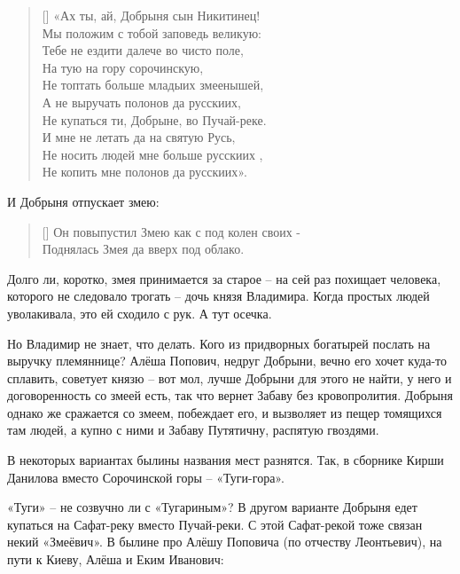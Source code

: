 \settowidth{\versewidth}{Не купаться ти, Добрыне, во Пучай-реке.} 
\begin{verse}[\versewidth]
«Ах ты, ай, Добрыня сын Никитинец!\\
Мы положим с тобой заповедь великую:\\
Тебе не ездити далече во чисто поле,\\
На тую на гору сорочинскую,\\
Не топтать больше младыих змеенышей,\\
А не выручать полонов да русскиих,\\
Не купаться ти, Добрыне, во Пучай-реке.\\
И мне не летать да на святую Русь,\\
Не носить людей мне больше русскиих ,\\
Не копить мне полонов да русскиих».\\
\end{verse}

И Добрыня отпускает змею:

\settowidth{\versewidth}{Он повыпустил Змею как с под колен своих -} 
\begin{verse}[\versewidth]
Он повыпустил Змею как с под колен своих -\\
Поднялась Змея да вверх под облако.\\
\end{verse}

Долго ли, коротко, змея принимается за старое – на сей раз похищает человека, которого не следовало трогать – дочь князя Владимира. Когда простых людей уволакивала, это ей сходило с рук. А тут осечка.

Но Владимир не знает, что делать. Кого из придворных богатырей послать на выручку племяннице? Алёша Попович, недруг Добрыни, вечно его хочет куда-то сплавить, советует князю – вот мол, лучше Добрыни для этого не найти, у него и договоренность со змеей есть, так что вернет Забаву без кровопролития. Добрыня однако же сражается со змеем, побеждает его, и вызволяет из пещер томящихся там людей, а купно с ними и Забаву Путятичну, распятую гвоздями.

В некоторых вариантах былины названия мест разнятся. Так, в сборнике Кирши Данилова вместо Сорочинской горы – «Туги-гора».

«Туги» – не созвучно ли с «Тугариным»? В другом варианте Добрыня едет купаться на Сафат-реку вместо Пучай-реки. С этой Сафат-рекой тоже связан некий «Змеёвич». В былине про Алёшу Поповича (по отчеству Леонтьевич), на пути к Киеву, Алёша и Еким Иванович:

